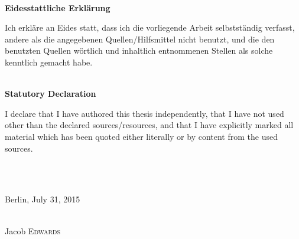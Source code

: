 \documentclass[%
   a4paper,%
  11pt,                    %
  oneside,
  openright,              %
  headsepline,          %
  cleardoubleempty,
  chapterprefix,
  titlepage,%
  liststotoc,%
  bibtotoc,%
  idxtotoc,%
  headinclude,           %
  pointlessnumbers,%
  USenglish
  ]{scrbook}
\renewcommand{\pdfbookmark}[3][]{}
\theoremstyle{break}
\begin{document}

\ \\ 
 
\vspace{1.0cm}
 
\textbf{Eidesstattliche Erkl\"arung}
 
Ich erkl\"are an Eides statt, dass ich die vorliegende Arbeit selbstst\"andig 
verfasst, andere als die angegebenen Quellen/Hilfsmittel nicht benutzt, 
und die den benutzten Quellen w\"ortlich und inhaltlich entnommenen Stellen 
als solche kenntlich gemacht habe.
 
\ \\
 
\textbf{Statutory Declaration}
 
I declare that I have authored this thesis independently, that I have not used 
other than the declared sources/resources, and that I have explicitly marked 
all material which has been quoted either literally or by content from the used sources.
 
\ \\ \ \\
 
\begin{flushright} 
 
Berlin, July 31, 2015
 
\ \\
 
Jacob \textsc{Edwards}
 
\end{flushright}
 
\newpage



\thispagestyle{empty}
\pdfbookmark{Abstract}{abstract}

\newpage

\thispagestyle{empty}
\pdfbookmark{Acknowledgements}{conform}

\newpage



\end{document}
